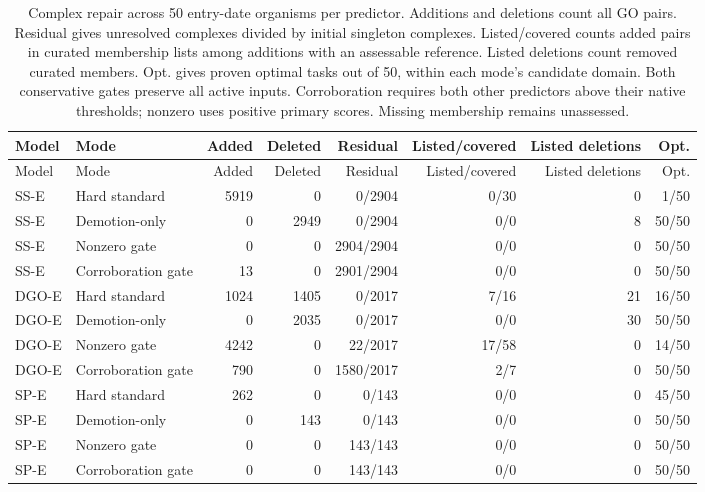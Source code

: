 \begingroup\scriptsize
\setlength{\tabcolsep}{4pt}
\begin{longtable}{llrrrrrr}
\caption{Complex repair across 50 entry-date organisms per predictor. Additions and deletions count all GO pairs. Residual gives unresolved complexes divided by initial singleton complexes. Listed/covered counts added pairs in curated membership lists among additions with an assessable reference. Listed deletions count removed curated members. Opt. gives proven optimal tasks out of 50, within each mode's candidate domain. Both conservative gates preserve all active inputs. Corroboration requires both other predictors above their native thresholds; nonzero uses positive primary scores. Missing membership remains unassessed.}\label{tab:supp-conservative-complexes}\\
\toprule
Model & Mode & Added & Deleted & Residual & Listed/covered & Listed deletions & Opt. \\
\midrule
\endfirsthead
\toprule
Model & Mode & Added & Deleted & Residual & Listed/covered & Listed deletions & Opt. \\
\midrule
\endhead
SS-E & Hard standard & 5919 & 0 & 0/2904 & 0/30 & 0 & 1/50 \\
SS-E & Demotion-only & 0 & 2949 & 0/2904 & 0/0 & 8 & 50/50 \\
SS-E & Nonzero gate & 0 & 0 & 2904/2904 & 0/0 & 0 & 50/50 \\
SS-E & Corroboration gate & 13 & 0 & 2901/2904 & 0/0 & 0 & 50/50 \\
DGO-E & Hard standard & 1024 & 1405 & 0/2017 & 7/16 & 21 & 16/50 \\
DGO-E & Demotion-only & 0 & 2035 & 0/2017 & 0/0 & 30 & 50/50 \\
DGO-E & Nonzero gate & 4242 & 0 & 22/2017 & 17/58 & 0 & 14/50 \\
DGO-E & Corroboration gate & 790 & 0 & 1580/2017 & 2/7 & 0 & 50/50 \\
SP-E & Hard standard & 262 & 0 & 0/143 & 0/0 & 0 & 45/50 \\
SP-E & Demotion-only & 0 & 143 & 0/143 & 0/0 & 0 & 50/50 \\
SP-E & Nonzero gate & 0 & 0 & 143/143 & 0/0 & 0 & 50/50 \\
SP-E & Corroboration gate & 0 & 0 & 143/143 & 0/0 & 0 & 50/50 \\
\bottomrule
\end{longtable}
\endgroup
